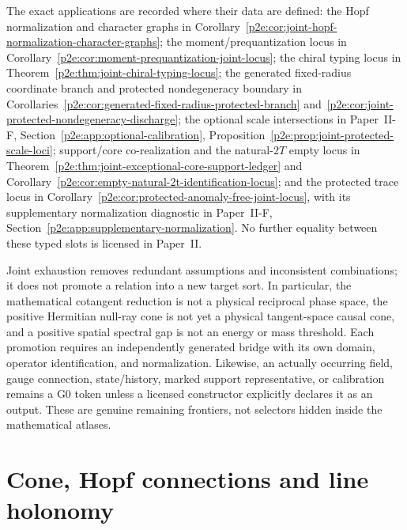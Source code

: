 \documentclass[12pt,a4paper]{article}
\begin{document}
\begin{remark}
\label{p2e:rem:joint-locus-index}
The exact applications are recorded where their data are defined:
the Hopf normalization and character graphs in
Corollary~\ref{p2e:cor:joint-hopf-normalization-character-graphs};
the moment/prequantization locus in
Corollary~\ref{p2e:cor:moment-prequantization-joint-locus};
the chiral typing locus in
Theorem~\ref{p2e:thm:joint-chiral-typing-locus}; the generated fixed-radius
coordinate branch and protected nondegeneracy boundary in
Corollaries~\ref{p2e:cor:generated-fixed-radius-protected-branch}
and~\ref{p2e:cor:joint-protected-nondegeneracy-discharge}; the optional scale
intersections in Paper~II-F, Section~\ref{p2e:app:optional-calibration},
Proposition~\ref{p2e:prop:joint-protected-scale-loci};
support/core co-realization and the natural-\(2T\) empty locus in
Theorem~\ref{p2e:thm:joint-exceptional-core-support-ledger} and
Corollary~\ref{p2e:cor:empty-natural-2t-identification-locus};
and the protected trace locus in
Corollary~\ref{p2e:cor:protected-anomaly-free-joint-locus}, with its
supplementary normalization diagnostic in
Paper~II-F, Section~\ref{p2e:app:supplementary-normalization}.
No further equality between these typed slots is licensed in Paper~II.
\end{remark}

\begin{remark}
\label{p2e:rem:remaining-cross-role-bridges}
Joint exhaustion removes redundant assumptions and inconsistent combinations;
it does not promote a relation into a new target sort.  In particular, the
mathematical cotangent reduction is not a physical reciprocal phase space, the
positive Hermitian null-ray cone is not yet a physical tangent-space causal
cone, and a positive spatial spectral gap is not an energy or mass threshold.
Each promotion requires an independently generated bridge with its own domain,
operator identification, and normalization.  Likewise, an actually occurring
field, gauge connection, state/history, marked support representative, or
calibration remains a G0 token unless a licensed constructor explicitly
declares it as an output.  These are genuine remaining frontiers, not selectors
hidden inside the mathematical atlases.
\end{remark}

\label{p2:part:kin-gravity}
\label{p2:part:gravity-handoffs}

\section{Cone, Hopf connections and line holonomy}
\label{paper2e:sec:organized-cone}
\end{document}
